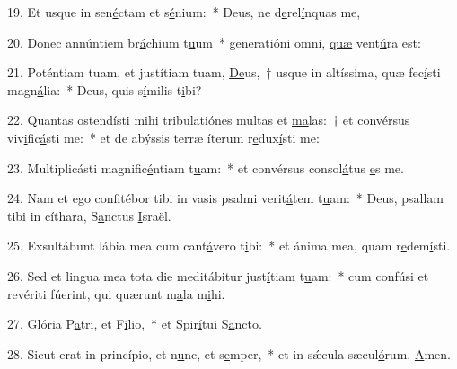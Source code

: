 19. Et usque in sen\uline{é}ctam et s\uline{é}nium:~* Deus, ne d\uline{e}rel\uline{í}nquas me,\par 
20. Donec annúntiem br\uline{á}chium t\uline{u}um~* generatióni omni, \uline{quæ} vent\uline{ú}ra est:\par 
21. Poténtiam tuam, et justítiam tuam, \uline{De}us,~† usque in altíssima, quæ fec\uline{í}sti magn\uline{á}lia:~* Deus, quis s\uline{í}milis t\uline{i}bi?\par 
22. Quantas ostendísti mihi tribulatiónes multas et \uline{ma}las:~† et convérsus viv\uline{i}fic\uline{á}sti me:~* et de abýssis terræ íterum r\uline{e}dux\uline{í}sti me:\par 
23. Multiplicásti magnific\uline{é}ntiam t\uline{u}am:~* et convérsus consol\uline{á}tus \uline{e}s me.\par 
24. Nam et ego confitébor tibi in vasis psalmi verit\uline{á}tem t\uline{u}am:~* Deus, psallam tibi in cíthara, S\uline{a}nctus \uline{I}sraël.\par 
25. Exsultábunt lábia mea cum cant\uline{á}vero t\uline{i}bi:~* et ánima mea, quam r\uline{e}dem\uline{í}sti.\par 
26. Sed et lingua mea tota die meditábitur just\uline{í}tiam t\uline{u}am:~* cum confúsi et revériti fúerint, qui quærunt m\uline{a}la m\uline{i}hi.\par 
27. Glória P\uline{a}tri, et F\uline{í}lio,~* et Spir\uline{í}tui S\uline{a}ncto.\par 
28. Sicut erat in princípio, et n\uline{u}nc, et s\uline{e}mper,~* et in sǽcula sæcul\uline{ó}rum. \uline{A}men.\par 
